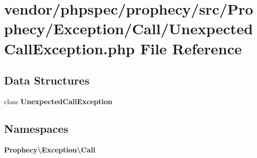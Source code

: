 \section{vendor/phpspec/prophecy/src/\+Prophecy/\+Exception/\+Call/\+Unexpected\+Call\+Exception.php File Reference}
\label{_unexpected_call_exception_8php}
\subsection*{Data Structures}
\begin{DoxyCompactItemize}
\item 
class {\bf Unexpected\+Call\+Exception}
\end{DoxyCompactItemize}
\subsection*{Namespaces}
\begin{DoxyCompactItemize}
\item 
 {\bf Prophecy\textbackslash{}\+Exception\textbackslash{}\+Call}
\end{DoxyCompactItemize}
